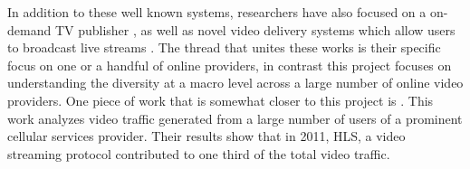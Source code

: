 \documentclass[]{sig-alternate-10pt}
\begin{document}
In addition to these well known systems, researchers have also focused
on a on-demand TV publisher \autocites{paytv}{ondemand}, as well as
novel video delivery systems which allow users to broadcast live streams
\autocites{ucsblive}{periscope}. The thread that unites these works is
their specific focus on one or a handful of online providers, in
contrast this project focuses on understanding the diversity at a macro
level across a large number of online video providers. One piece of work
that is somewhat closer to this project is \autocite{ottgorilla}. This
work analyzes video traffic generated from a large number of users of a
prominent cellular services provider. Their results show that in 2011,
HLS, a video streaming protocol contributed to one third of the total
video traffic.

\printbibliography[title=Bibliography]
\end{document}
